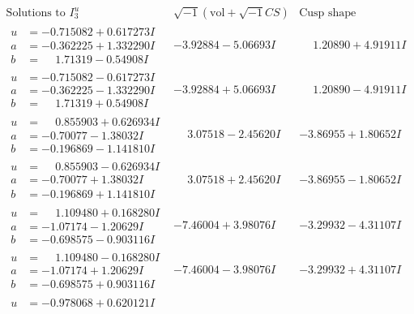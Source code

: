 \documentclass[1p]{elsarticle_modified}
\theoremstyle{definition}
\newcommand{\I}{\sqrt{-1}}
\begin{document}
$$\begin{array}{c|c|c}  
\text{Solutions to }I^u_{3}& \I (\text{vol} + \sqrt{-1}CS) & \text{Cusp shape}\\
 \hline 
\begin{aligned}
u &= -0.715082 + 0.617273 I \\
a &= -0.362225 + 1.332290 I \\
b &= \phantom{-}1.71319 - 0.54908 I\end{aligned}
 & -3.92884 - 5.06693 I & \phantom{-}1.20890 + 4.91911 I \\ \hline\begin{aligned}
u &= -0.715082 - 0.617273 I \\
a &= -0.362225 - 1.332290 I \\
b &= \phantom{-}1.71319 + 0.54908 I\end{aligned}
 & -3.92884 + 5.06693 I & \phantom{-}1.20890 - 4.91911 I \\ \hline\begin{aligned}
u &= \phantom{-}0.855903 + 0.626934 I \\
a &= -0.70077 - 1.38032 I \\
b &= -0.196869 - 1.141810 I\end{aligned}
 & \phantom{-}3.07518 - 2.45620 I & -3.86955 + 1.80652 I \\ \hline\begin{aligned}
u &= \phantom{-}0.855903 - 0.626934 I \\
a &= -0.70077 + 1.38032 I \\
b &= -0.196869 + 1.141810 I\end{aligned}
 & \phantom{-}3.07518 + 2.45620 I & -3.86955 - 1.80652 I \\ \hline\begin{aligned}
u &= \phantom{-}1.109480 + 0.168280 I \\
a &= -1.07174 - 1.20629 I \\
b &= -0.698575 - 0.903116 I\end{aligned}
 & -7.46004 + 3.98076 I & -3.29932 - 4.31107 I \\ \hline\begin{aligned}
u &= \phantom{-}1.109480 - 0.168280 I \\
a &= -1.07174 + 1.20629 I \\
b &= -0.698575 + 0.903116 I\end{aligned}
 & -7.46004 - 3.98076 I & -3.29932 + 4.31107 I \\ \hline\begin{aligned}
u &= -0.978068 + 0.620121 I \\

\end{aligned}
\end{array}$$
\end{document}
